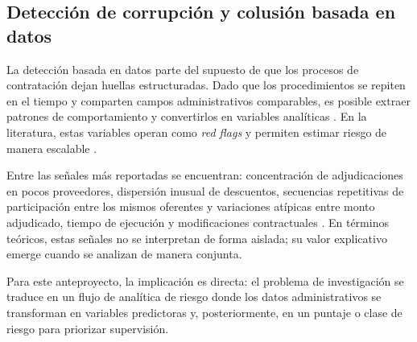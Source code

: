 \subsection{Detección de corrupción y colusión basada en datos}

La detección basada en datos parte del supuesto de que los procesos de contratación dejan huellas estructuradas. Dado que los procedimientos se repiten en el tiempo y comparten campos administrativos comparables, es posible extraer patrones de comportamiento y convertirlos en variables analíticas \cite{zhang2022collusion, tas2024machine}. En la literatura, estas variables operan como \textit{red flags} y permiten estimar riesgo de manera escalable \cite{decarolis2022corruption, lyra2022fraud}.

Entre las señales más reportadas se encuentran: concentración de adjudicaciones en pocos proveedores, dispersión inusual de descuentos, secuencias repetitivas de participación entre los mismos oferentes y variaciones atípicas entre monto adjudicado, tiempo de ejecución y modificaciones contractuales \cite{decarolis2022corruption, wachs2019network}. En términos teóricos, estas señales no se interpretan de forma aislada; su valor explicativo emerge cuando se analizan de manera conjunta.

Para este anteproyecto, la implicación es directa: el problema de investigación se traduce en un flujo de analítica de riesgo donde los datos administrativos se transforman en variables predictoras y, posteriormente, en un puntaje o clase de riesgo para priorizar supervisión.

